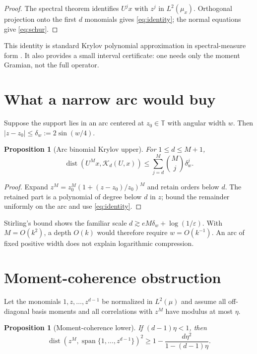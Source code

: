 \documentclass[11pt]{article}
\newtheorem{proposition}[theorem]{Proposition}
\newcommand{\K}{\mathcal K}
\begin{document}
\begin{proof}
The spectral theorem identifies $U^jx$ with $z^j$ in
$L^2(\mu_x)$.  Orthogonal projection onto the first $d$ monomials gives
\eqref{eq:identity}; the normal equations give \eqref{eq:schur}.
\end{proof}

This identity is standard Krylov polynomial approximation in spectral-measure
form \citep{Saad2003}.  It also provides a small interval certificate: one
needs only the moment Gramian, not the full operator.

\section{What a narrow arc would buy}

Suppose the support lies in an arc centered at $z_0\in\mathbb T$ with angular
width $w$.  Then $|z-z_0|\le\delta_w:=2\sin(w/4)$.

\begin{proposition}[Arc binomial Krylov upper]
\label{prop:arc}
For $1\le d\le M+1$,
\begin{equation}
 \operatorname{dist}(U^Mx,\K_d(U,x))
 \le\sum_{j=d}^{M}\binom Mj\delta_w^j.
 \label{eq:arc-upper}
\end{equation}
\end{proposition}

\begin{proof}
Expand
$z^M=z_0^M(1+(z-z_0)/z_0)^M$ and retain orders below $d$.  The retained part
is a polynomial of degree below $d$ in $z$; bound the remainder uniformly on
the arc and use \eqref{eq:identity}.
\end{proof}

Stirling's bound shows the familiar scale
$d\gtrsim eM\delta_w+\log(1/\varepsilon)$.  With
$M=O(k^2)$, a depth $O(k)$ would therefore require $w=O(k^{-1})$.  An arc of
fixed positive width does not explain logarithmic compression.

\section{Moment-coherence obstruction}

Let the monomials $1,z,\ldots,z^{d-1}$ be normalized in $L^2(\mu)$ and assume
all off-diagonal basis moments and all correlations with $z^M$ have modulus
at most $\eta$.

\begin{proposition}[Moment-coherence lower]
\label{prop:coherence}
If $(d-1)\eta<1$, then
\begin{equation}
 \operatorname{dist}(z^M,\operatorname{span}\{1,\ldots,z^{d-1}\})^2
 \ge1-\frac{d\eta^2}{1-(d-1)\eta}.
 \label{eq:coherence}
\end{equation}
\end{proposition}
\end{document}
